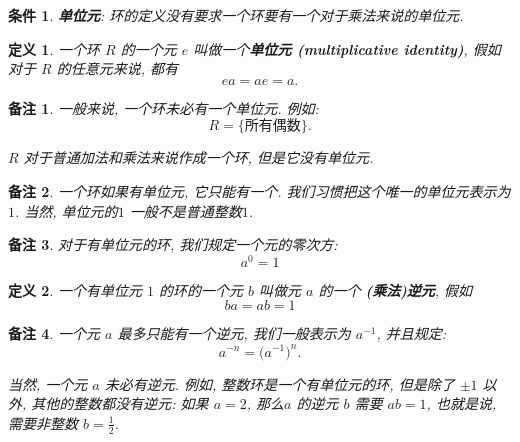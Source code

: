 \documentclass[utf8]{ctexbook}
\newtheorem{definition}{定义}[section]
\newtheorem{memo}{备注}[section]
\newtheorem{condition}{条件}[section]
\begin{document}
\begin{condition}
\textbf{单位元}: 环的定义没有要求一个环要有一个对于乘法来说的单位元.
\end{condition}

\begin{definition}
一个环 $R$ 的一个元 $e$ 叫做一个\textbf{单位元 (multiplicative identity)}, 假如对于 $R$ 的任意元来说, 都有
\begin{equation}
e a = a e = a .
\end{equation}
\end{definition}

\begin{memo}
一般来说, 一个环未必有一个单位元. 例如:
\begin{equation}
R = \{ \mbox{所有偶数} \} .
\end{equation}

$R$ 对于普通加法和乘法来说作成一个环, 但是它没有单位元.

\end{memo}

\begin{memo}
一个环如果有单位元, 它只能有一个. 我们习惯把这个唯一的单位元表示为 $1$. 当然, 单位元的$1$ 一般不是普通整数$1$. 
\end{memo}

\begin{memo}
对于有单位元的环, 我们规定一个元的零次方:
\begin{equation}
a^0 = 1
\end{equation}

\end{memo}

\begin{definition}
一个有单位元 $1$ 的环的一个元 $b$ 叫做元 $a$ 的一个 \textbf{(乘法)逆元}, 假如
\begin{equation}
b a = a b = 1
\end{equation} 
\end{definition}

\begin{memo}
一个元 $a$ 最多只能有一个逆元, 我们一般表示为 $a^{-1}$, 并且规定:
\begin{equation}
a^{-n} = \big( a^{-1} \big)^n .
\end{equation}


当然, 一个元 $a$ 未必有逆元. 例如, 整数环是一个有单位元的环, 但是除了 $\pm 1$ 以外, 其他的整数都没有逆元: 如果 $a=2$, 那么$a$ 的逆元 $b$ 需要 $a b = 1$, 也就是说, 需要非整数 $b = \frac{1}{2}$. 
\end{memo}
\end{document}
